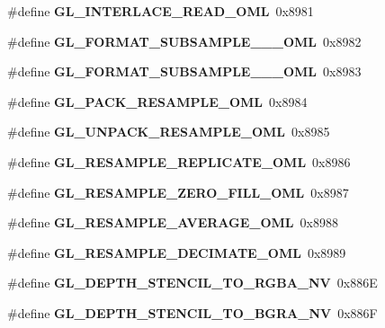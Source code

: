 \begin{DoxyCompactItemize}
\item 
\#define {\bfseries G\+L\+\_\+\+I\+N\+T\+E\+R\+L\+A\+C\+E\+\_\+\+R\+E\+A\+D\+\_\+\+O\+M\+L}~0x8981\label{_s_d_l__opengl_8h_aa8227e116def16e08615c1a94b5e09b0}

\item 
\#define {\bfseries G\+L\+\_\+\+F\+O\+R\+M\+A\+T\+\_\+\+S\+U\+B\+S\+A\+M\+P\+L\+E\+\_\+\_\+\_\+\+O\+M\+L}~0x8982\label{_s_d_l__opengl_8h_ab3ae603f1bf87c0f17546c1dd5e595f1}

\item 
\#define {\bfseries G\+L\+\_\+\+F\+O\+R\+M\+A\+T\+\_\+\+S\+U\+B\+S\+A\+M\+P\+L\+E\+\_\+\_\+\_\+\+O\+M\+L}~0x8983\label{_s_d_l__opengl_8h_aea886532b08c9c42548ceef3cd6a27d8}

\item 
\#define {\bfseries G\+L\+\_\+\+P\+A\+C\+K\+\_\+\+R\+E\+S\+A\+M\+P\+L\+E\+\_\+\+O\+M\+L}~0x8984\label{_s_d_l__opengl_8h_a556bfb1b6527bd01115a665c57cbe5d0}

\item 
\#define {\bfseries G\+L\+\_\+\+U\+N\+P\+A\+C\+K\+\_\+\+R\+E\+S\+A\+M\+P\+L\+E\+\_\+\+O\+M\+L}~0x8985\label{_s_d_l__opengl_8h_a4f3f7b1f54ff2feaea0fe258595917d5}

\item 
\#define {\bfseries G\+L\+\_\+\+R\+E\+S\+A\+M\+P\+L\+E\+\_\+\+R\+E\+P\+L\+I\+C\+A\+T\+E\+\_\+\+O\+M\+L}~0x8986\label{_s_d_l__opengl_8h_a40ef2455bab17770e83c0953d7d26874}

\item 
\#define {\bfseries G\+L\+\_\+\+R\+E\+S\+A\+M\+P\+L\+E\+\_\+\+Z\+E\+R\+O\+\_\+\+F\+I\+L\+L\+\_\+\+O\+M\+L}~0x8987\label{_s_d_l__opengl_8h_a9c4a63eaa6492d676a10fb08bcc849c5}

\item 
\#define {\bfseries G\+L\+\_\+\+R\+E\+S\+A\+M\+P\+L\+E\+\_\+\+A\+V\+E\+R\+A\+G\+E\+\_\+\+O\+M\+L}~0x8988\label{_s_d_l__opengl_8h_aed076e3a192aeb1e0ab4c321fb6de486}

\item 
\#define {\bfseries G\+L\+\_\+\+R\+E\+S\+A\+M\+P\+L\+E\+\_\+\+D\+E\+C\+I\+M\+A\+T\+E\+\_\+\+O\+M\+L}~0x8989\label{_s_d_l__opengl_8h_a9dd241ee43db832e8dce321753e66273}

\item 
\#define {\bfseries G\+L\+\_\+\+D\+E\+P\+T\+H\+\_\+\+S\+T\+E\+N\+C\+I\+L\+\_\+\+T\+O\+\_\+\+R\+G\+B\+A\+\_\+\+N\+V}~0x886\+E\label{_s_d_l__opengl_8h_ac39eca34947d78670cc67f00d89f25f1}

\item 
\#define {\bfseries G\+L\+\_\+\+D\+E\+P\+T\+H\+\_\+\+S\+T\+E\+N\+C\+I\+L\+\_\+\+T\+O\+\_\+\+B\+G\+R\+A\+\_\+\+N\+V}~0x886\+F\label{_s_d_l__opengl_8h_af58b87cc77c862953ed02f2c0577fa59}


\end{DoxyCompactItemize}
